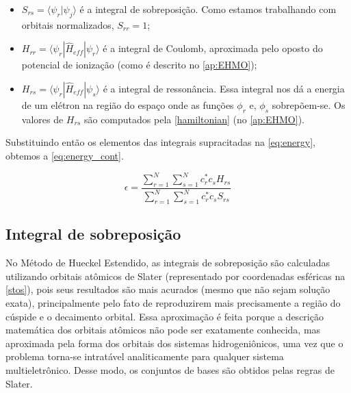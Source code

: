 \begin{itemize}
    \item $\displaystyle S_{rs} = \langle \psi_r | \psi_j \rangle$ é a integral de sobreposição. Como estamos trabalhando com orbitais normalizados, $S_{rr} = 1$;
    
    \item $\displaystyle H_{rr} = \langle \psi_r | \hat{H}_{eff} | \psi_r \rangle$ é a integral de Coulomb, aproximada pelo oposto do potencial de ionização (como é descrito no \autoref{ap:EHMO});
    
    \item $\displaystyle H_{rs} = \langle \psi_r | \hat{H}_{eff} | \psi_s \rangle$ é a integral de ressonância. Essa integral nos dá a energia de um elétron na região do espaço onde as funções $\phi_r$ e, $\phi_s$ sobrepõem-se. Os valores de $H_{rs}$ são computados pela \autoref{hamiltonian} (no \autoref{ap:EHMO}).
\end{itemize}

Substituindo então os elementos das integrais supracitadas na \autoref{eq:energy}, obtemos a \autoref{eq:energy_cont}.

\begin{equation}
\label{eq:energy_cont}
    \epsilon = \frac{\displaystyle \sum_{r=1}^{N} \sum_{s=1}^{N} c^*_r c_s H_{rs}}{\displaystyle \sum_{r=1}^{N} \sum_{s=1}^{N} c^*_r c_s S_{rs}}
\end{equation}

\subsection{Integral de sobreposição}\label{sec:overlap}

No Método de Hueckel Estendido, as integrais de sobreposição são calculadas utilizando orbitais atômicos de Slater (representado por coordenadas esféricas na \autoref{stos}), pois seus resultados são mais acurados (mesmo que não sejam solução exata), principalmente pelo fato de reproduzirem mais precisamente a região do cúspide e o decaimento orbital. Essa aproximação é feita porque a descrição matemática dos orbitais atômicos não pode ser exatamente conhecida, mas aproximada pela forma dos orbitais dos sistemas hidrogeniônicos, uma vez que o problema torna-se intratável analiticamente para qualquer sistema multieletrônico. Desse modo, os conjuntos de bases são obtidos pelas regras de Slater\autocite{Slater1930, Lu2006}.


